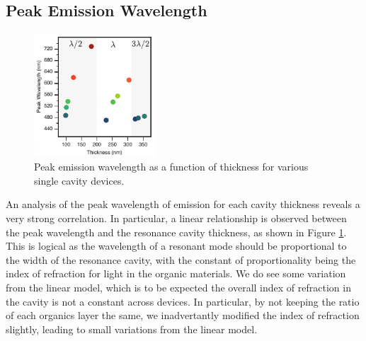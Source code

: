 \documentclass{report}
\begin{document}

    
        \subsection{Peak Emission Wavelength} \label{peakWavelength}
            \begin{figure}
                \centering
                \vspace{-1cm}
                \includegraphics[width=0.4\textwidth]{images/n1_peak_emission.png}
                \caption{\small Peak emission wavelength as a function of thickness for various single cavity devices.}
                \label{fig:peak_emission}
            \end{figure}

            An analysis of the peak wavelength of emission for each cavity thickness reveals a very strong correlation. In particular, a linear relationship is observed between the peak wavelength and the resonance cavity thickness, as shown in Figure \ref{fig:peak_emission}. This is logical as the wavelength of a resonant mode should be proportional to the width of the resonance cavity, with the constant of proportionality being the index of refraction for light in the organic materials. We do see some variation from the linear model, which is to be expected the overall index of refraction in the cavity is not a constant across devices. In particular, by not keeping the ratio of each organics layer the same, we inadvertantly modified the index of refraction slightly, leading to small variations from the linear model.
            
\end{document}

